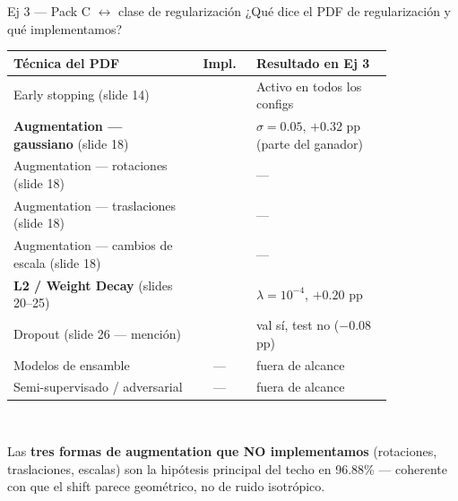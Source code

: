 \documentclass[11pt,aspectratio=169]{beamer}
\newcommand{\ok}{\textcolor{good}{\ding{52}}}
\newcommand{\nok}{\textcolor{warn}{\ding{56}}}
\begin{document}
\begin{frame}{Ej 3 — Pack C $\leftrightarrow$ clase de regularización}
\small ¿Qué dice el PDF de regularización y qué implementamos?\\[0.3em]

\centering\footnotesize
\begin{tabular}{@{}p{0.48\linewidth}cp{0.36\linewidth}@{}}
\toprule
\textbf{Técnica del PDF} & \textbf{Impl.} & \textbf{Resultado en Ej 3} \\
\midrule
Early stopping (slide 14)                       & \ok & Activo en todos los configs \\
\rowcolor{accent2!10}
\textbf{Augmentation — gaussiano} (slide 18)    & \ok & $\sigma=0.05$, $+0.32$ pp (parte del ganador) \\
Augmentation — rotaciones (slide 18)            & \nok & --- \\
Augmentation — traslaciones (slide 18)          & \nok & --- \\
Augmentation — cambios de escala (slide 18)     & \nok & --- \\
\rowcolor{accent2!10}
\textbf{L2 / Weight Decay} (slides 20--25)      & \ok & $\lambda = 10^{-4}$, $+0.20$ pp \\
Dropout (slide 26 — mención)                    & \ok & val sí, test no ($-0.08$ pp) \\
Modelos de ensamble                             & --- & fuera de alcance \\
Semi-supervisado / adversarial                  & --- & fuera de alcance \\
\bottomrule
\end{tabular}\\[0.6em]

\begin{insight}
Las \textbf{tres formas de augmentation que NO implementamos} (rotaciones, traslaciones, escalas) son la hipótesis principal del techo en 96.88\% — coherente con que el shift parece geométrico, no de ruido isotrópico.
\end{insight}
\end{frame}
\end{document}

